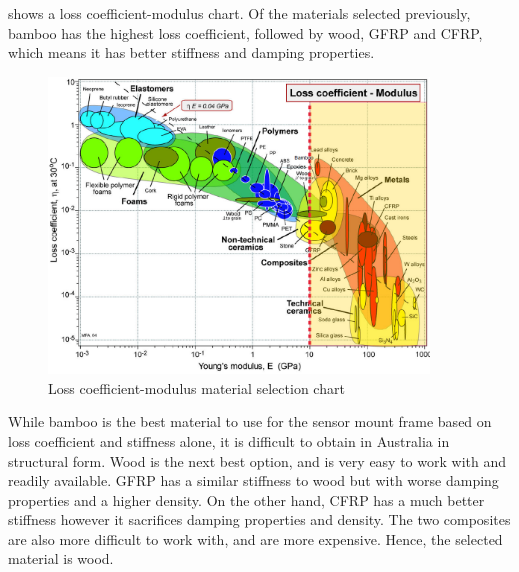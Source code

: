 \documentclass[main.tex]{subfiles}
\begin{document}
\begin{appendices}
 shows a loss coefficient-modulus chart. Of the materials selected previously, bamboo has the highest loss coefficient, followed by wood, GFRP and CFRP, which means it has better stiffness and damping properties. 
\begin{figure}[ht]
\includegraphics[width=0.9\textwidth]{8-Appendices/loss.PNG}
\centering
\caption[Loss coefficient-modulus material selection chart]{Loss coefficient-modulus material selection chart \parencite{Ashby11}} 
\end{figure}

While bamboo is the best material to use for the sensor mount frame based on loss coefficient and stiffness alone, it is difficult to obtain in Australia in structural form. Wood is the next best option, and is very easy to work with and readily available. GFRP has a similar stiffness to wood but with worse damping properties and a higher density. On the other hand, CFRP has a much better stiffness however it sacrifices damping properties and density. The two composites are also more difficult to work with, and are more expensive. Hence, the selected material is wood.



\end{appendices}
\end{document}
